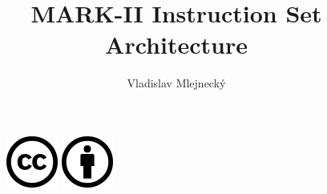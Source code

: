 \documentclass[11pt, a4paper]{article}
\author{Vladislav Mlejnecký}
\title{\huge MARK-II Instruction Set Architecture}
\begin{document}
\maketitle
\vfill
\begin{figure}[h]
\centering
\begin{minipage}{.06\textwidth}
  \centering
  \includegraphics[width=.9\linewidth]{img/lic/cc.png}
\end{minipage}
\begin{minipage}{.06\textwidth}
  \centering
  \includegraphics[width=.9\linewidth]{img/lic/by.png}

\end{minipage}
\end{figure}
\end{document}
